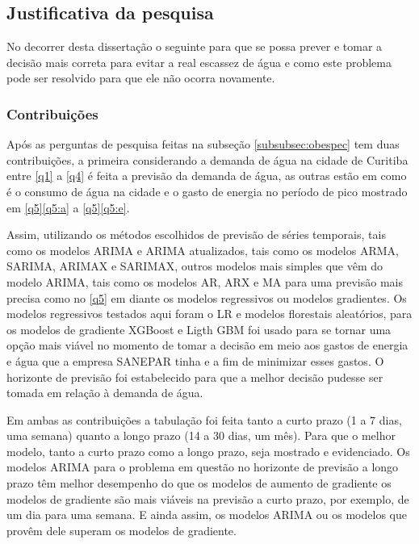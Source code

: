 \subsection{Justificativa da pesquisa} \label{subsec:justif}

No decorrer desta dissertação o seguinte para que se possa prever e tomar a decisão mais correta para evitar a real escassez de água e como este problema pode ser resolvido para que ele não ocorra novamente.

\subsubsection{Contribui\c c\~oes} \label{subsubsec:Contribuição}

Após as perguntas de pesquisa feitas na subseção \ref{subsubsec:obespec} tem duas contribuições, a primeira considerando a demanda de água na cidade de Curitiba entre \ref{q1} a \ref{q4} é feita a previsão da demanda de água, as outras estão em como é o consumo de água na cidade e o gasto de energia no período de pico mostrado em \ref{q5}\ref{q5:a} a \ref{q5}\ref{q5:e}.


Assim, utilizando os métodos escolhidos de previsão de séries temporais, tais como os modelos ARIMA e ARIMA atualizados, tais como os modelos ARMA, SARIMA, ARIMAX e SARIMAX, outros modelos mais simples que vêm do modelo ARIMA, tais como os modelos AR, ARX e MA para uma previsão mais precisa como no \ref{q5} em diante os modelos regressivos ou modelos gradientes. Os modelos regressivos testados aqui foram o LR e modelos florestais aleatórios, para os modelos de gradiente XGBoost e Ligth GBM foi usado para se tornar uma opção mais viável no momento de tomar a decisão em meio aos gastos de energia e água que a empresa SANEPAR tinha e a fim de minimizar esses gastos. O horizonte de previsão foi estabelecido para que a melhor decisão pudesse ser tomada em relação à demanda de água.

Em ambas as contribuições a tabulação foi feita tanto a curto prazo (1 a 7 dias, uma semana) quanto a longo prazo (14 a 30 dias, um mês). Para que o melhor modelo, tanto a curto prazo como a longo prazo, seja mostrado e evidenciado. Os modelos ARIMA para o problema em questão no horizonte de previsão a longo prazo têm melhor desempenho do que os modelos de aumento de gradiente os modelos de gradiente são mais viáveis na previsão a curto prazo, por exemplo, de um dia para uma semana. E ainda assim, os modelos ARIMA ou os modelos que provêm dele superam os modelos de gradiente.

